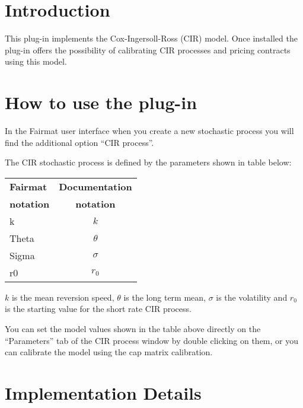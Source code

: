 \newcommand{\pluginName}{CIR Model}
\newcommand{\pluginVersion}{1.0}





\PluginTitle{\pluginName}{\pluginVersion}

\section{Introduction}
This plug-in implements the Cox-Ingersoll-Ross (CIR) model. Once installed the plug-in offers the possibility of calibrating CIR processes and pricing contracts using this model. 

\section{How to use the plug-in}


In the Fairmat user interface when you create a new stochastic process you will find the additional option ``CIR process''.

The CIR stochastic process is defined by the parameters shown in table below:
\begin{center}
\begin{tabular}{|l|c|}
  \hline
\textbf{Fairmat}&\textbf{Documentation}\\
\textbf{notation}&\textbf{notation}\\
                     \hline
 k 	& $k$\\
 Theta	& $\theta$\\
 Sigma 	& $\sigma$\\
 r0	& $r_0$\\
   \hline
\end{tabular}
\end{center}
$k$ is the mean reversion speed, $\theta$ is the long term mean, $\sigma$ is the volatility and $r_0$ is the starting value for the short rate CIR process.

You can set the model values shown in the table above directly on the ``Parameters'' tab of the CIR process window by double clicking on them, or you can calibrate
the model using the cap matrix calibration.

\section{Implementation Details}
